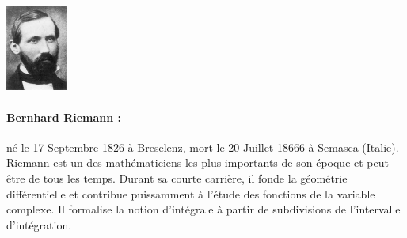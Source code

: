 \begin{minipage}{0.2\linewidth}
\begin{center}\includegraphics[width=2cm]{images/Riemann.jpg}\end{center}
\end{minipage}
\begin{minipage}{0.80 \linewidth}
\small{\paragraph*{Bernhard Riemann :} né le  17 Septembre 1826 à Breselenz, mort le 20 Juillet 18666 à Semasca (Italie). Riemann est un des mathématiciens les plus importants de son époque et peut être de tous les temps. Durant sa courte carrière, il fonde la géométrie différentielle et contribue puissamment à l'étude des fonctions de la variable complexe. Il formalise la notion d'intégrale à partir de subdivisions de l'intervalle d'intégration.}
\end{minipage}

\vfill


